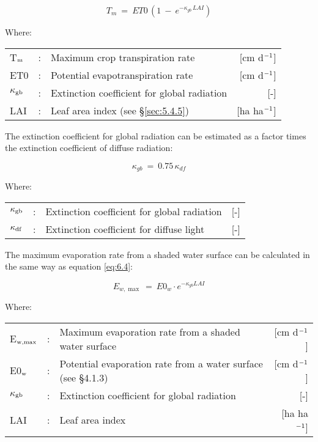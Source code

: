\begin{equation}
T _{m} ~=~ ET0\, (1~-~e ^{-\kappa _{gb} \, LAI} )
\end{equation}
 
Where:\\[5pt]
\begin{tabularx}{\textwidth}{llXr}
T$_{{\rm m}}$ &:& Maximum crop transpiration rate & [cm d$^{{\rm -1}}$]\\
ET0 &:& Potential evapotranspiration rate & [cm d$^{{\rm -1}}$]\\
$\kappa$$_{{\rm gb}}$ &:& Extinction coefficient for global radiation & [-]\\
LAI &:& Leaf area index (see \S \ref{sec:5.4.5}) & [ha ha$^{{\rm -1}}$]\\
\end{tabularx}

The extinction coefficient for global radiation can be estimated as a factor times the
extinction coefficient of diffuse radiation:

\begin{equation}
\kappa_{gb} ~=~ 0.75\, \kappa_{df} 
\end{equation}

Where:\\[5pt]
\begin{tabularx}{\textwidth}{llXr}
$\kappa_{{\rm gb}}$ &:& Extinction coefficient for global radiation & [-]\\
$\kappa_{{\rm df}}$ &:& Extinction coefficient for diffuse light & [-]\\
\end{tabularx}

The maximum evaporation rate from a shaded water surface can be calculated in the same
way as equation \ref{eq:6.4}: 

\begin{equation}
E_{w,\max } ~=~ E0_{w} \cdot e^{-\kappa_{gb} LAI}
\end{equation}

Where:\\[5pt]
\begin{tabularx}{\textwidth}{llXr}
E$_{{\rm w,max}}$ &:& Maximum evaporation rate from a shaded water surface & [cm d$^{{\rm -1}}$]\\
E0$_{{\rm w}}$ &:& Potential evaporation rate from a water surface (see \S 4.1.3) & [cm d$^{{\rm -1}}$]\\
$\kappa$$_{{\rm gb}}$ &:& Extinction coefficient for global radiation & [-]\\
LAI &:& Leaf area index & [ha ha$^{{\rm -1}}$]\\
\end{tabularx}

